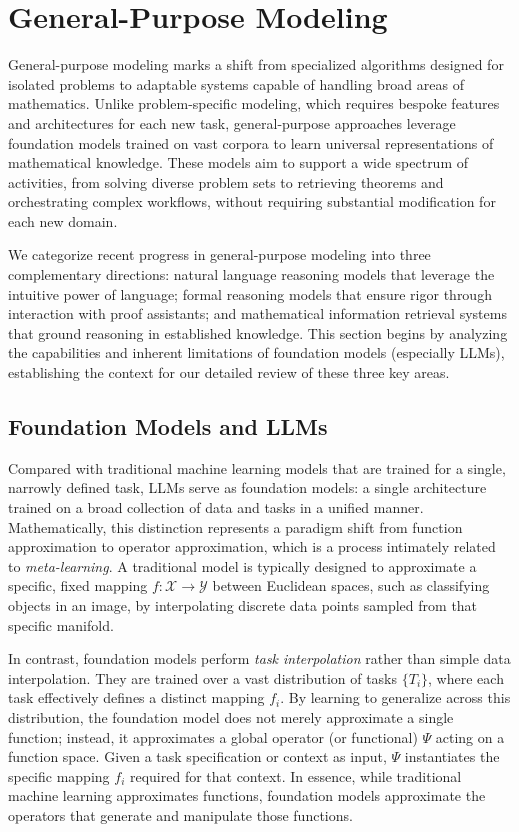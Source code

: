 \documentclass[11pt]{article}
\numberwithin{equation}{section}
\begin{document}
\section{General-Purpose Modeling}\label{sec:grm}

General-purpose modeling marks a shift from specialized algorithms designed for isolated problems to adaptable systems capable of handling broad areas of mathematics. Unlike problem-specific modeling, which requires bespoke features and architectures for each new task, general-purpose approaches leverage foundation models trained on vast corpora to learn universal representations of mathematical knowledge. These models aim to support a wide spectrum of activities, from solving diverse problem sets to retrieving theorems and orchestrating complex workflows, without requiring substantial modification for each new domain.

We categorize recent progress in general-purpose modeling into three complementary directions: natural language reasoning models that leverage the intuitive power of language; formal reasoning models that ensure rigor through interaction with proof assistants; and mathematical information retrieval systems that ground reasoning in established knowledge. This section begins by analyzing the capabilities and inherent limitations of foundation models (especially LLMs), establishing the context for our detailed review of these three key areas.






\subsection{Foundation Models and LLMs}


Compared with traditional machine learning models that are trained for a single, narrowly defined task, LLMs serve as foundation models: a single architecture trained on a broad collection of data and tasks in a unified manner. Mathematically, this distinction represents a paradigm shift from function approximation to operator approximation, which is a process intimately related to \textit{meta-learning}. A traditional model is typically designed to approximate a specific, fixed mapping $f: \mathcal{X} \to \mathcal{Y}$ between Euclidean spaces, such as classifying objects in an image, by interpolating discrete data points sampled from that specific manifold.

In contrast, foundation models perform \textit{task interpolation} rather than simple data interpolation. They are trained over a vast distribution of tasks $\{T_i\}$, where each task effectively defines a distinct mapping $f_i$. By learning to generalize across this distribution, the foundation model does not merely approximate a single function; instead, it approximates a global operator (or functional) $\Psi$ acting on a function space. Given a task specification or context as input, $\Psi$ instantiates the specific mapping $f_i$ required for that context. In essence, while traditional machine learning approximates functions, foundation models approximate the operators that generate and manipulate those functions. 
\end{document}
